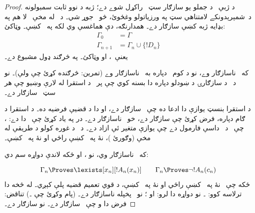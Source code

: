 \documentclass[12pt,a4paper,oneside]{report}
\theoremstyle{definition}
\begin{document}
\label{olpseg:OLP-0130-B014:start}
\begin{proof}
د ژبې~ د جملو يو سازګار سټ~\LR{$\Gamma$} راکړل
شوے دے؛ ژبه د نوو ثابت سمبولونه د~شمېرېدونکے لامتناهي سټ په
ورزياتولو وغځوئ، څو~ جوړ شي۔ د~
له مخې~\LR{$\Gamma$} لا هم په بډايه ژبه کښې سازګار دے۔ همدارنګه،
 دې هماغسې وي لکه په~ کښې۔ وټاکئ:
\begin{align*}
\Gamma_0 & = \Gamma \\
\Gamma_{n+1} & = \Gamma_n \cup \{!D_n \}
\end{align*}
يعنې~، او
 وټاکئ۔  په څرګند ډول
مشبوع دے۔
\label{olpseg:OLP-0130-B014:end}

\label{olpseg:OLP-0130-B015:start}
که~ ناسازګار وے، نو د کوم~ دپاره به~
ناسازګار وے (تمرين: څرګنده کړئ چې ولې)۔ نو د~ د سازګارۍ
د ښودلو دپاره دا بسنه کوي چې پر~ د استقرا له لارې وښيو چې هر
سټ~ سازګار دے۔
\label{olpseg:OLP-0130-B015:end}

\label{olpseg:OLP-0130-B016:start}
د استقرا بنسټ يوازې دا ادعا ده چې~ سازګار دے،
او دا د قضيې فرضيه ده۔ د استقرا د ګام دپاره، فرض کړئ چې
 سازګار دے، خو~ ناسازګار دے۔ در په ياد کړئ چې~ دا
دے:
،
چې~ د~ داسې فارمول دے چې يوازې متغير
 ئې ازاد دے۔ د~ د غوره کولو د طريقې له مخې (وګورئ
)،  نۀ په~ کښې راځي او نۀ
په~ کښې۔
\label{olpseg:OLP-0130-B016:end}

\label{olpseg:OLP-0130-B017:start}
که~ ناسازګار وي، نو
، او ځکه لاندې دواړه سم دي:

\[
\Gamma_n \Proves \lexists[x_n][!A_n(x_n)]
\qquad
\Gamma_n \Proves \lnot !A_n(c_n)
\]
ځکه چې~ نۀ په~ کښې راځي او نۀ په~
کښې، د قوي تعميم قضيه
پلې کېږي۔ له 
څخه دا ترلاسه کوو:
۔
نو دواړه دا لرو:
 او
؛
نو~ پخپله ناسازګار دے۔
(پام وکړئ چې
\LR{$\lforall[x_n][\lnot !A_n(x_n)] \Proves
  \lnot\lexists[x_n][!A_n(x_n)]$}۔)
تناقض: فرض دا و چې~ سازګار دے۔ نو
 سازګار دے۔
\end{proof}
\label{olpseg:OLP-0130-B017:end}
\end{document}
